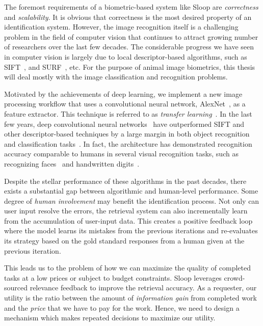 The foremost requirements of a biometric-based system like Sloop are
\emph{correctness} and \emph{scalability}. It is obvious that correctness is the
most desired property of an identification system. However, the image
recognition itself is a challenging problem in the field of computer vision that
continues to attract growing number of researchers over the last few decades.
The considerable progress we have seen in computer vision is largely due to
local descriptor-based algorithms, such as SIFT~\cite{lowe04}, and
SURF~\cite{surf08}, etc.  For the purpose of animal image biometrics, this
thesis will deal mostly with the image classification and recognition problems.

Motivated by the achievements of deep learning, we implement a new image
processing workflow that uses a convolutional neural network,
AlexNet~\cite{kriz12}, as a feature extractor. This technique is
referred to as \emph{transfer learning}~\cite{transfer, finetune}. In the last
few years, deep convolutional neural networks~\cite{lecun95, kriz12} have
outperformed SIFT and other descriptor-based techniques by a large margin in
both object recognition and classification tasks~\cite{kriz12, fisher14,
ILSVRC15}. In fact, the architecture has demonstrated recognition accuracy
comparable to humans in several visual recognition tasks, such as recognizing
faces~\cite{deepface14} and handwritten digits~\cite{mnist13}.

Despite the stellar performance of these algorithms in the past decades, there
exists a substantial gap between algorithmic and human-level performance. Some
degree of \emph{human involvement} may benefit the identification process. Not
only can user input resolve the errors, the retrieval system can also
incrementally learn from the accumulation of user-input data. This creates a
positive feedback loop where the model learns its mistakes from the previous
iterations and re-evaluates its strategy based on the gold standard responses
from a human given at the previous iteration.

This leads us to the problem of how we can maximize the quality of completed
tasks at a low prices or subject to budget constraints. Sloop leverages
crowd-sourced relevance feedback to improve the retrieval accuracy. As a
requester, our utility is the ratio between the amount of \emph{information
gain} from completed work and the \emph{price} that we have to pay for the work.
Hence, we need to design a mechanism which makes repeated decisions to maximize
our utility.


